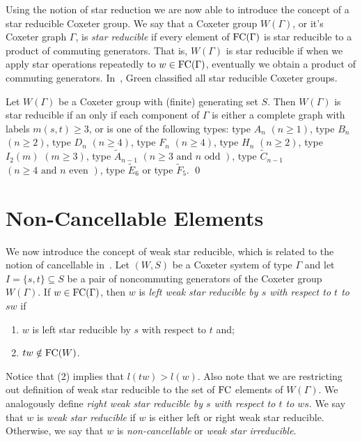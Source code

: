 Using the notion of star reduction we are now able to introduce the concept of a star reducible Coxeter group. We say that a Coxeter group $W(\Gamma)$, or it's Coxeter graph $\Gamma$, is \emph{star reducible} if every element of $\mathrm{FC}(\Gamma)$ is star reducible to a product of commuting generators. That is, $W(\Gamma)$ is star reducible if when we apply star operations repeatedly to $w \in \mathrm{FC}(\Gamma)$, eventually we obtain a product of commuting generators. In~\cite{Green2006a}, Green classified all star reducible Coxeter groups. 
\begin{theorem}
	Let $W(\Gamma)$ be a Coxeter group with (finite) generating set $S$. Then $W(\Gamma)$ is star reducible if an only if each component of $\Gamma$ is either a complete graph with labels $m(s,t)\geq 3$, or is one of the following types: type $A_n$ $(n \geq 1)$, type $B_n$ $(n \geq 2)$, type $D_n$ $(n \geq 4)$, type $F_n$ $(n \geq 4)$, type $H_n$ $(n \geq 2)$, type $I_2(m)$ $(m \geq 3)$, type $\widetilde{A}_{n-1}$ $(n \geq 3 \textrm{ and } n \textrm{ odd })$, type $\widetilde{C}_{n-1}$ $(n\geq 4 \textrm{ and } n \textrm{ even })$, type $\widetilde{E}_6$ or type $\widetilde{F}_5$. \qed
\end{theorem}  

\section{Non-Cancellable Elements}
 
We now introduce the concept of weak star reducible, which is related to the notion of cancellable in~\cite{Fan1997}. Let $(W,S)$ be a Coxeter system of type $\Gamma$ and let $I=\{s,t\} \subseteq S$ be a pair of noncommuting generators of the Coxeter group $W(\Gamma)$. If $w  \in \mathrm{FC}(\Gamma)$, then $w$ is \emph{left weak star reducible by $s$ with respect to $t$ to $sw$} if
\begin{enumerate}
\item $w$ is left star reducible by $s$ with respect to $t$ and;
\item $tw \notin \mathrm{FC}(W)$.	
\end{enumerate}
Notice that (2) implies that $l(tw)>l(w)$. Also note that we are restricting out definition of weak star reducible to the set of $\mathrm{FC}$ elements of $W(\Gamma)$. We analogously define \emph{right weak star reducible by $s$ with respect to $t$ to $ws$}. We say that $w$ is \emph{weak star reducible} if $w$ is either left or right weak star reducible. Otherwise, we say that $w$ is \emph{non-cancellable} or \emph{weak star irreducible}.

